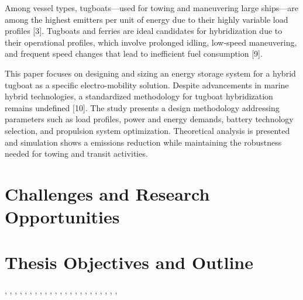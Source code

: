 Among vessel types, tugboats—used for towing and maneuvering large ships—are among the highest emitters per unit of energy due to their highly variable load profiles [3]. Tugboats and ferries are ideal candidates for hybridization due to their operational profiles, which involve prolonged idling, low-speed maneuvering, and frequent speed changes that lead to inefficient fuel consumption [9].

This paper focuses on designing and sizing an energy storage system for a hybrid tugboat as a specific electro-mobility solution. Despite advancements in marine hybrid technologies, a standardized methodology for tugboat hybridization remains undefined [10]. The study presents a design methodology addressing parameters such as load profiles, power and energy demands, battery technology selection, and propulsion system optimization. Theoretical analysis is presented and simulation shows a emissions reduction while maintaining the robustness needed for towing and transit activities.

\section{Challenges and Research Opportunities}


\section{Thesis Objectives and Outline}




\cite{10735355},
\cite{10679076},
\cite{10472698},
\cite{10382632},
\cite{10269751},
\cite{10091779},
\cite{10136711},
\cite{10015728},
\cite{9937167},
\cite{9738734},
\cite{9913469},
\cite{9360490},
\cite{9340547},
\cite{9242285},
\cite{9184122},
\cite{9299429},
\cite{9046048},
\cite{8322257},
\cite{7945527},
\cite{8013775},
\cite{7956250},
\cite{7836306},
\cite{7604136},



